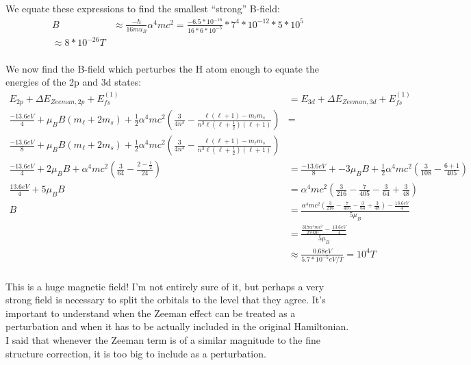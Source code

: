 \documentclass[10pt]{article} %
\begin{document}
We equate these expressions to find the smallest ``strong'' B-field:\\

\begin{align*}
  B &\approx \frac{-\hbar}{16mu_B}\alpha^4mc^2
  = \frac{-6.5*10^{-16}}{16*6*10^{-5}}*7^4*10^{-12}*5*10^5\\
  \approx 8*10^{-26}T\\
\end{align*}

We now find the B-field which perturbes the H atom enough to equate the energies of the 2p and 3d
states:\\

\begin{align*}
  E_{2p} + \Delta E_{Zeeman, 2p} + E_{fs}^{(1)} &= E_{3d} + \Delta E_{Zeeman, 3d} + E_{fs}^{(1)}\\
  \frac{-13.6eV}{4} + \mu_BB(m_\ell+2m_s)
  + \frac{1}{2}\alpha^4mc^2\left(\frac{3}{4n^3}
  -\frac{\ell(\ell+1)-m_\ell m_s}{n^3\ell(\ell+\frac{1}{2})(\ell+1)}\right)
  &=\\ \frac{-13.6eV}{8} + \mu_BB(m_\ell+2m_s) + \frac{1}{2}\alpha^4mc^2\left(\frac{3}{4n^3}
  -\frac{\ell(\ell+1)-m_\ell m_s}{n^3\ell(\ell+\frac{1}{2})(\ell+1)}\right)\\
  \frac{-13.6eV}{4} + 2\mu_BB
  + \alpha^4mc^2\left(\frac{3}{64}
  -\frac{2-\frac{1}{2}}{24}\right)
  &= \frac{-13.6eV}{8} + -3\mu_BB + \frac{1}{2}\alpha^4mc^2\left(\frac{3}{108}
  -\frac{6+1}{405}\right)\\
  \frac{13.6eV}{4} + 5\mu_BB
  &= \alpha^4mc^2
  \left(\frac{3}{216} - \frac{7}{405} - \frac{3}{64} + \frac{3}{48}\right)\\
  B &= \frac{\alpha^4mc^2
    \left(\frac{3}{216} - \frac{7}{405} - \frac{3}{64} + \frac{3}{48}\right) - \frac{13.6eV}{4}}{5\mu_B}\\
  &= \frac{\frac{317\alpha^4mc^2}{25920} - \frac{13.6eV}{4}}{5\mu_B}\\
  &\approx \frac{0.68eV}{5.7*10^{-5}eV/T} = 10^4 T\\
\end{align*}

This is a huge magnetic field! I'm not entirely sure of it, but perhaps a very strong field is
necessary to split the orbitals to the level that they agree. It's important to understand when
the Zeeman effect can be treated as a perturbation and when it has to be actually included in
the original Hamiltonian. I said that whenever the Zeeman term is of a similar magnitude to the
fine structure correction, it is too big to include as a perturbation.\\
\end{document}
